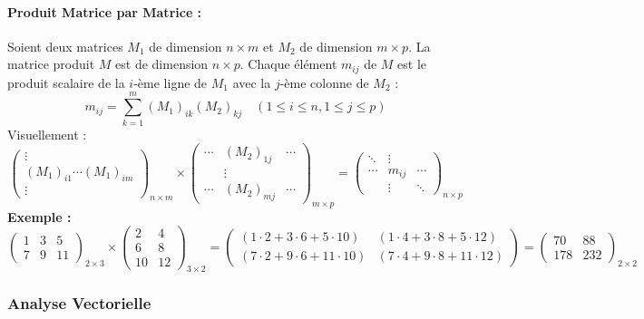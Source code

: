 \documentclass{article}
\begin{document}
\paragraph{Produit Matrice par Matrice :}
Soient deux matrices $M_1$ de dimension $n \times m$ et $M_2$ de dimension $m \times p$. La matrice produit $M$ est de dimension $n \times p$.
Chaque élément $m_{ij}$ de $M$ est le produit scalaire de la $i$-ème ligne de $M_1$ avec la $j$-ème colonne de $M_2$ :
\[ m_{ij} = \sum_{k=1}^{m} (M_1)_{ik} (M_2)_{kj} \quad (1 \le i \le n, 1 \le j \le p) \]
Visuellement :
\[
\begin{pmatrix} \vdots \\ \hline (M_1)_{i1} \cdots (M_1)_{im} \\ \hline \vdots \end{pmatrix}_{n \times m}
\times
\begin{pmatrix} \cdots & (M_2)_{1j} & \cdots \\ & \vdots & \\ \cdots & (M_2)_{mj} & \cdots \end{pmatrix}_{m \times p}
=
\begin{pmatrix} \ddots & \vdots & \\ \cdots & m_{ij} & \cdots \\ & \vdots & \ddots \end{pmatrix}_{n \times p}
\]
\textbf{Exemple :}
\[
\begin{pmatrix} 1 & 3 & 5 \\ 7 & 9 & 11 \end{pmatrix}_{2 \times 3}
\times
\begin{pmatrix} 2 & 4 \\ 6 & 8 \\ 10 & 12 \end{pmatrix}_{3 \times 2}
=
\begin{pmatrix}
(1\!\cdot\!2 \!+\! 3\!\cdot\!6 \!+\! 5\!\cdot\!10) & (1\!\cdot\!4 \!+\! 3\!\cdot\!8 \!+\! 5\!\cdot\!12) \\
(7\!\cdot\!2 \!+\! 9\!\cdot\!6 \!+\! 11\!\cdot\!10) & (7\!\cdot\!4 \!+\! 9\!\cdot\!8 \!+\! 11\!\cdot\!12)
\end{pmatrix}
=
\begin{pmatrix} 70 & 88 \\ 178 & 232 \end{pmatrix}_{2 \times 2}
\]

\subsubsection{Analyse Vectorielle}
\end{document}
